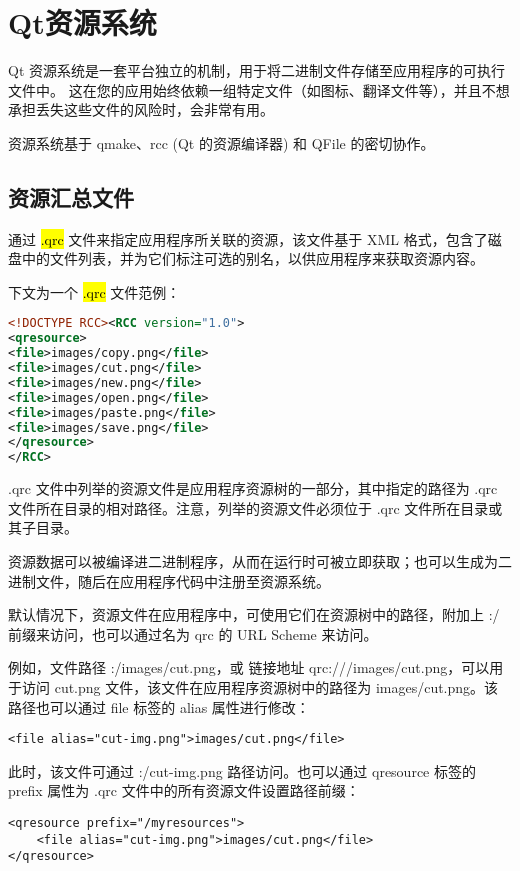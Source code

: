 \chapter{Qt资源系统}

Qt 资源系统是一套平台独立的机制，用于将二进制文件存储至应用程序的可执行文件中。
这在您的应用始终依赖一组特定文件（如图标、翻译文件等），并且不想承担丢失这些文件的风险时，会非常有用。

资源系统基于 qmake、rcc (Qt 的资源编译器) 和 QFile 的密切协作。

\section{资源汇总文件}

通过 \hl{.qrc} 文件来指定应用程序所关联的资源，该文件基于 XML 格式，包含了磁盘中的文件列表，并为它们标注可选的别名，以供应用程序来获取资源内容。

下文为一个 \hl{.qrc} 文件范例：

\begin{lstlisting}[language=XML]
<!DOCTYPE RCC><RCC version="1.0">
<qresource>
<file>images/copy.png</file>
<file>images/cut.png</file>
<file>images/new.png</file>
<file>images/open.png</file>
<file>images/paste.png</file>
<file>images/save.png</file>
</qresource>
</RCC>
\end{lstlisting}

.qrc 文件中列举的资源文件是应用程序资源树的一部分，其中指定的路径为 .qrc 文件所在目录的相对路径。注意，列举的资源文件必须位于 .qrc 文件所在目录或其子目录。

资源数据可以被编译进二进制程序，从而在运行时可被立即获取；也可以生成为二进制文件，随后在应用程序代码中注册至资源系统。

默认情况下，资源文件在应用程序中，可使用它们在资源树中的路径，附加上 :/ 前缀来访问，也可以通过名为 qrc 的 URL Scheme 来访问。

例如，文件路径 :/images/cut.png，或 链接地址 qrc:///images/cut.png，可以用于访问 cut.png 文件，该文件在应用程序资源树中的路径为 images/cut.png。该路径也可以通过 file 标签的 alias 属性进行修改：

\begin{lstlisting}
<file alias="cut-img.png">images/cut.png</file>
\end{lstlisting}

此时，该文件可通过 :/cut-img.png 路径访问。也可以通过 qresource 标签的 prefix 属性为 .qrc 文件中的所有资源文件设置路径前缀：

\begin{lstlisting}
<qresource prefix="/myresources">
    <file alias="cut-img.png">images/cut.png</file>
</qresource>
\end{lstlisting}

